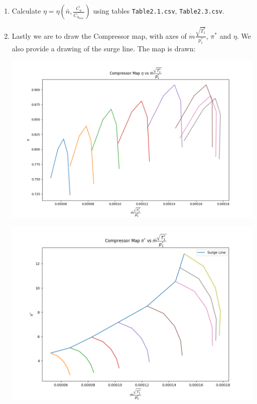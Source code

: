 \documentclass[12pt,english]{article}
\begin{document}
\begin{enumerate}
    \item Calculate $\eta = \eta (\bar{n}, \frac{\bar{C_{a}}}{\bar{C_{a_{base}}}})$ using tables \verb|Table2.1.csv|, \verb|Table2.3.csv|.
    
    \item Lastly we are to draw the Compressor map, with axes of $\dot{m} \frac{\sqrt{T^{*}_{1}}}{p^{*}_{1}}$, $\pi^{*}$ and $\eta$. We also provide a drawing of the surge line. The map is drawn:
    
    \begin{center}
        \includegraphics[width=\textwidth]{CompressorMap1.png}

    
        \includegraphics[width=\textwidth]{CompressorMap2.png}


\end{center}
\end{enumerate}
\end{document}
